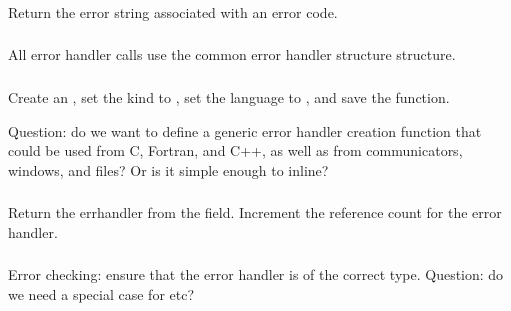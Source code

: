 \documentclass{article}
\begin{document}
\subsubsection{}
Return the error string associated with an error code.

\subsubsection{}

\subsubsection{}

\subsubsection{}

\subsubsection{}
All error handler calls use the common error handler structure
 structure.  

\subsubsection{}
Create an , set the kind to
, set the language to , and
save the function.  

Question: do we want to define a generic error handler
creation function that could be used from C, Fortran, and C++, as well as from
communicators, windows, and files?  Or is it simple enough to inline?

\subsubsection{}
Return the errhandler from the  field.  Increment the 
reference count for the error handler.

\subsubsection{}
Error checking: ensure that the error handler is of the correct type.  
Question: do we need a special case for  etc?
\end{document}
